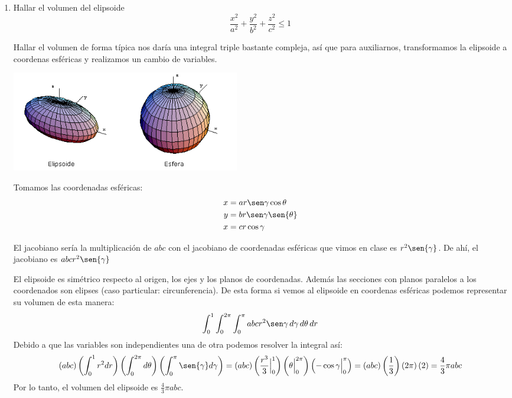 \documentclass{article}
\begin{document}
\begin{enumerate}
        \item {
            Hallar el volumen del elipsoide
            \[
                \frac{x^2}{a^2}+\frac{y^2}{b^2}+\frac{z^2}{c^2}\leq 1
            \]

            \color{azul}
            Hallar el volumen de forma típica nos daría una integral triple
            bastante compleja, así que para auxiliarnos, transformamos la
            elipsoide a coordenas esféricas y realizamos un cambio de variables.
            \begin{center}
                \includegraphics[width=10cm]{img/elipsoide.png}
        	\end{center}
            Tomamos las coordenadas esféricas:
            \begin{align*}
                x &= ar\sen\gamma\cos{\theta}\\
                y &= br\sen\gamma\sen{\theta}\\
                x &= cr\cos\gamma
            \end{align*}

            El jacobiano sería la multiplicación de $abc$ con el jacobiano de
            coordenadas esféricas que vimos en clase es $r^2\sen{\gamma}$. De
            ahí, el jacobiano es $abcr^2\sen{\gamma}$

            El elipsoide es simétrico respecto al origen, los ejes y los planos
            de coordenadas. Además las secciones con planos paralelos a los
            coordenados son elipses (caso particular: circunferencia). De esta
            forma si vemos al elipsoide en coordenas esféricas podemos
            representar su volumen de esta manera:
        	\[
                \int_{0}^{1}{
                    \int_{0}^{2\pi}{
                        \int_{0}^{\pi}{
                            abcr^2\sen\gamma
                        \,d\gamma}
                    \,d\theta}
                \,dr}
            \]
            Debido a que las variables son independientes una de otra podemos
            resolver la integral así:
            \[
                (abc)
                \left(\int_{0}^{1}r^2 dr\right)
                \left(\int_{0}^{2\pi} d\theta\right)
                \left(\int_{0}^{\pi}\sen{\gamma} d\gamma\right)
                =
                (abc)
                \left(\frac{r^3}{3}\Big|_0^1\right)
                \left(\theta\Big|_0^{2\pi}\right)
                \left(-\cos{\gamma}\Big|_0^{\pi}\right)
                =
                (abc)\left(\frac{1}{3}\right)
                \left(2\pi\right)(2)
                =
                \frac{4}{3}\pi abc
            \]
            Por lo tanto, el volumen del elipsoide es
            $\displaystyle \frac{4}{3}\pi abc$.
        }


\end{enumerate}
\end{document}
